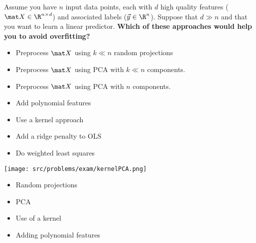 \documentclass[preview]{standalone}
\begin{document}
\begin{Parts}
	\Part Assume you have $n$ input data points, each with $d$ high quality features ($\mat X\in \R^{n\times d}$) and associated labels ($\vec y\in \R^n$). Suppose that $d \gg n$ and that you want to learn a linear predictor. {\bf Which of these approaches would help you to avoid overfitting?}
        		
	\begin{multicols}{2}
		\begin{itemize}
			\item[\mcqb] Preprocess $\mat X$ using $k \ll n$ random projections
			\item[\mcqb] Preprocess $\mat X$ using PCA
                          with $k \ll n$ components.
            \item[\mcqb] Preprocess $\mat X$ using PCA with $n$ components.
			\item[\mcqb] Add polynomial features
			\item[\mcqb] Use a kernel approach
                                                \item[\mcqb] Add a ridge penalty to OLS
                        \item[\mcqb] Do weighted least squares
                \end{itemize}
	\end{multicols}

	

\ifexamnosol
\newpage
\fi

                                			        		                        		        
				
									
	

                                                        
									
	
        			
									
	
        
    \begin{center} \texttt{[image: src/problems/exam/kernelPCA.png]} \end{center}

	\begin{multicols}{2}
		\begin{itemize}
			\item[\mcqb] Random projections
			\item[\mcqb] PCA
			\item[\mcqb] Use of a kernel
			\item[\mcqb] Adding polynomial features
	  \end{itemize}
	\end{multicols}


\end{Parts}
\end{document}
